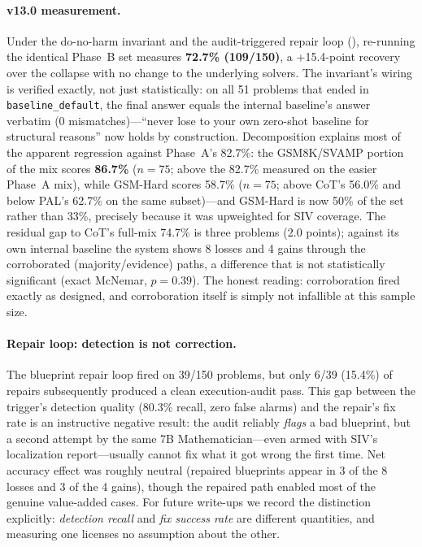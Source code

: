 \documentclass[11pt,a4paper]{article}
\begin{document}
\paragraph{v13.0 measurement.}
Under the do-no-harm invariant and the audit-triggered repair loop (), re-running the identical Phase~B set measures \textbf{72.7\% (109/150)}, a +15.4-point recovery over the collapse with no change to the underlying solvers.
The invariant's wiring is verified exactly, not just statistically: on all 51 problems that ended in \texttt{baseline\_default}, the final answer equals the internal baseline's answer verbatim (0 mismatches)---``never lose to your own zero-shot baseline for structural reasons'' now holds by construction.
Decomposition explains most of the apparent regression against Phase~A's 82.7\%: the GSM8K/SVAMP portion of the mix scores \textbf{86.7\%} ($n{=}75$; above the 82.7\% measured on the easier Phase~A mix), while GSM-Hard scores 58.7\% ($n{=}75$; above CoT's 56.0\% and below PAL's 62.7\% on the same subset)---and GSM-Hard is now 50\% of the set rather than 33\%, precisely because it was upweighted for SIV coverage.
The residual gap to CoT's full-mix 74.7\% is three problems (2.0 points); against its own internal baseline the system shows 8 losses and 4 gains through the corroborated (majority/evidence) paths, a difference that is not statistically significant (exact McNemar, $p=0.39$).
The honest reading: corroboration fired exactly as designed, and corroboration itself is simply not infallible at this sample size.

\paragraph{Repair loop: detection is not correction.}
The blueprint repair loop fired on 39/150 problems, but only 6/39 (15.4\%) of repairs subsequently produced a clean execution-audit pass.
This gap between the trigger's detection quality (80.3\% recall, zero false alarms) and the repair's fix rate is an instructive negative result: the audit reliably \emph{flags} a bad blueprint, but a second attempt by the same 7B Mathematician---even armed with SIV's localization report---usually cannot fix what it got wrong the first time.
Net accuracy effect was roughly neutral (repaired blueprints appear in 3 of the 8 losses and 3 of the 4 gains), though the repaired path enabled most of the genuine value-added cases.
For future write-ups we record the distinction explicitly: \emph{detection recall} and \emph{fix success rate} are different quantities, and measuring one licenses no assumption about the other.
\end{document}
